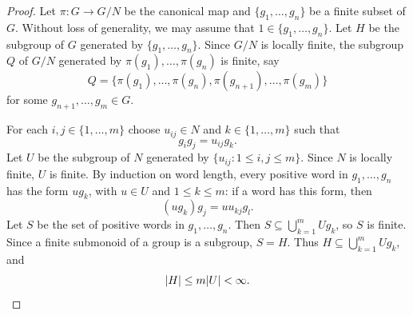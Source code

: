 \begin{proof}
	Let $\pi\colon G\to G/N$ be the canonical map and $\{g_1,\dots,g_n\}$ be a finite subset of $G$. Without loss of generality, we may assume that $1\in\{g_1,\dots,g_n\}$. Let $H$ be the subgroup of $G$ generated
	by $\{g_1,\dots,g_n\}$. 
	Since $G/N$ is locally finite, the subgroup $Q$ of $G/N$ generated by 
	$\pi(g_1),\dots,\pi(g_n)$ is finite, say
	\[
		Q=\{\pi(g_1),\dots,\pi(g_n),\pi(g_{n+1}),\dots,\pi(g_m)\}
	\]
	for some $g_{n+1},\dots,g_m\in G$. 
	
	For each $i,j\in\{1,\dots,m\}$ choose $u_{ij}\in N$ and 
	$k\in\{1,\dots,m\}$ such that \[
	g_ig_j=u_{ij}g_k.
	\]
	Let $U$ be the subgroup of $N$
	generated by $\{u_{ij}:1\leq i,j\leq m\}$. Since $N$ is locally finite, $U$ is finite.
	By induction on word
	length, every positive word in $g_1,\dots,g_n$ has the form $ug_k$, with $u\in U$ and $1\leq k\leq m$: if a word has this form, then
	\[
 	(ug_k)g_j=u u_{kj}g_l.
	\]
	Let $S$ be the set of positive words in $g_1,\dots,g_n$.
	Then $S\subseteq\bigcup_{k=1}^m Ug_k$, so $S$ is finite.
	Since a finite submonoid of a group is a subgroup, $S=H$.
	Thus $H\subseteq\bigcup_{k=1}^m Ug_k$, and
	\[ 
	|H|\leq m|U|<\infty.\qedhere 
	\]	
\end{proof}






